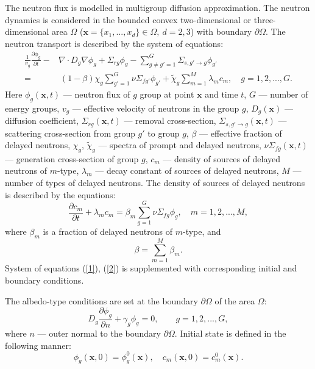 \documentclass[authoryear]{elsarticle}
\begin{document}
The neutron flux is modelled in multigroup diffusion approximation. The neutron dynamics is considered in the bounded convex two-dimensional or three-dimensional area  $\Omega$ ($\bm x = \{x_1, ..., x_d\} \in \Omega, \ d = 2,3$) with boundary $\partial \Omega$. The neutron transport is described by the system of equations:
\begin{equation}\label{1}
\begin{split}
 \frac{1}{v_g} \frac{\partial \phi_g}{\partial t} - & \nabla \cdot D_g \nabla \phi_g + \Sigma_{rg} \phi_g 
 - \sum_{g\neq g'=1}^{G} \Sigma_{s,g'\rightarrow g} \phi_{g'} \\
 =  & \ (1-\beta) \chi_g \sum_{g'=1}^{G} \nu \Sigma_{fg'} \phi_{g'} + \widetilde{\chi}_g \sum_{m=1}^{M} \lambda_m c_m , \quad 
 g = 1,2, ..., G .
\end{split}
\end{equation} 
Here $\phi_g(\bm x,t)$ --- neutron flux of $g$ group at point $\bm x$ and time $t$,
$G$ --- number of energy groups,
$v_g$ --- effective velocity of neutrons in the group $g$,
$D_g(\bm x)$ --- diffusion coefficient, $\Sigma_{rg}(\bm x,t)$ --- removal cross-section,
$\Sigma_{s,g'\rightarrow g}(\bm x,t)$ --- scattering cross-section from group $g'$ to group $g$,
$\beta$ --- effective fraction of delayed neutrons, $\chi_g$, $\widetilde{\chi}_g$  --- spectra of prompt and delayed neutrons, 
$\nu\Sigma_{fg}(\bm x,t)$ --- generation cross-section of group $g$,
$c_m$ --- density of sources of delayed neutrons of $m$-type,  $\lambda_m$ --- decay constant of sources of delayed neutrons,
$M$ --- number of types of delayed neutrons.
The density of sources of delayed neutrons is described by the equations:
\begin{equation}\label{2}
 \frac{\partial c_m}{\partial t} + \lambda_m c_m = \beta_m \sum_{g=1}^{G} \nu \Sigma_{fg} \phi_g ,
 \quad m = 1,2, ..., M , 
\end{equation} 
where $\beta_m$ is a fraction of delayed neutrons of $m$-type, and
\[
 \beta = \sum_{m=1}^{M} \beta_m .
\] 
System of equations (\ref{1}), (\ref{2}) is supplemented with corresponding initial and boundary conditions.

The albedo-type conditions are set at the boundary $\partial \Omega$ of the area $\Omega$:
\begin{equation}\label{3}
 D_g\frac{\partial \phi_g}{\partial n} + \gamma_g \phi_g = 0, \quad 
 \quad g = 1,2, ..., G ,
\end{equation}
where $n$ --- outer normal to the boundary $\partial \Omega$.
Initial state is defined in the following manner:
\begin{equation}\label{4}
 \phi_g(\bm x,0) = \phi_g^0(\bm x), 
 \quad c_m(\bm x,0) = c_m^0(\bm x) . 
\end{equation} 
\end{document}
